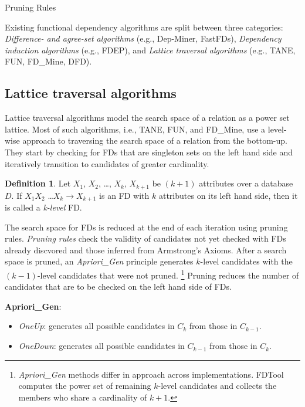 \documentclass[6pt,twoside]{article}
\theoremstyle{plain}
\theoremstyle{definition}
\newtheorem{defn}{Definition}[section]
\begin{document}
\begin{section}{Pruning Rules}

Existing functional dependency algorithms are split between three categories: \textit{Difference- and agree-set algorithms} (e.g., Dep-Miner, FastFDs), \textit{Dependency induction algorithms} (e.g., FDEP), and \textit{Lattice traversal algorithms} (e.g., TANE, FUN, FD\_Mine, DFD). 

\subsection[Lattice traversal algorithms]{Lattice traversal algorithms}

Lattice traversal algorithms model the search space of a relation as a power set lattice. Most of such algorithms, i.e., TANE, FUN, and FD\_Mine, use a level-wise approach to traversing the search space of a relation from the bottom-up. They start by checking for FDs that are singleton sets on the left hand side and iteratively transition to candidates of greater cardinality.

\begin{defn}
	\label{k-level}
	Let $X_{1}$, $X_{2}$, \ldots, $X_{k}$, $X_{k+1}$ be $(k+1)$ attributes over a database $D$. If $X_{1}X_{2}$ \ldots $X_{k} \rightarrow X_{k+1}$ is an FD with $k$ attributes on its left hand side, then it is called a \textit{k-level} FD. 
\end{defn}

The search space for FDs is reduced at the end of each iteration using pruning rules. \textit{Pruning rules} check the validity of candidates not yet checked with FDs already discvored and those inferred from Armstrong's Axioms. After a search space is pruned, an \textit{Apriori\_Gen} principle generates $k$-level candidates with the $(k-1)$-level candidates that were not pruned. \footnote{\textit{Apriori\_Gen} methods differ in approach across implementations. FDTool computes the power set of remaining $k$-level candidates and collects the members who share a cardinality of $k+1$.} Pruning reduces the number of candidates that are to be checked on the left hand side of FDs.

{
\bigskip
\noindent
\textbf{Apriori\_Gen}:

\begin{itemize}[leftmargin=*]
\item \textit{OneUp}: generates all possible candidates in $C_k$ from those in $C_{k-1}$.
\item \textit{OneDown}: generates all possible candidates in $C_{k-1}$ from those in $C_k$.
\end{itemize}
} 


\end{section}
\end{document}
